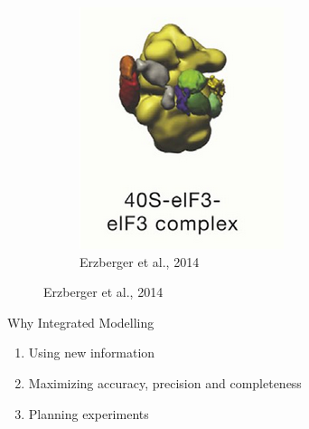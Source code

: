 \begin{frame}
\begin{figure}[h]
\begin{subfigure}[b]{0.3\textwidth}
            \includegraphics[width=\textwidth]{images/three.png}
            \caption{Erzberger et al., 2014}
            \label{fig:image3}
        \end{subfigure}
        
        \label{fig:three_images}
    \end{figure}
\end{frame}

\begin{frame}{Why Integrated Modelling}
    \begin{enumerate}
        \item Using new information
        \item Maximizing accuracy, precision and completeness
        \item Planning experiments
    \end{enumerate}
\end{frame}

